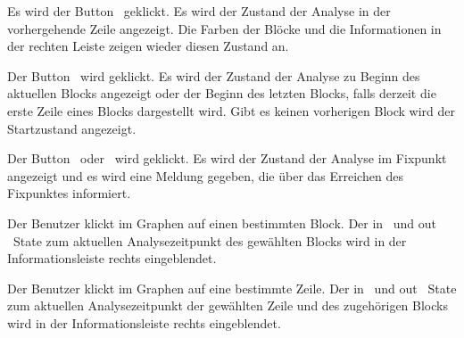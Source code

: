 {Es wird der Button \faBackward\ geklickt.}
{Es wird der Zustand der Analyse in der vorhergehende Zeile angezeigt. Die Farben der Blöcke und die Informationen in der rechten Leiste zeigen wieder diesen Zustand an.}

{Der Button \faFastBackward\ wird geklickt.}
{Es wird der Zustand der Analyse zu Beginn des aktuellen Blocks angezeigt oder der Beginn des letzten Blocks, falls derzeit die erste Zeile eines Blocks dargestellt wird. Gibt es keinen vorherigen Block wird der Startzustand angezeigt.}

{Der Button \faForward\ oder \faFastForward\ wird geklickt.}
{Es wird der Zustand der Analyse im Fixpunkt angezeigt und es wird eine Meldung gegeben, die über das Erreichen des Fixpunktes informiert.}

\tests{}

{Der Benutzer klickt im Graphen auf einen bestimmten Block.}
{Der \glqq in \grqq\ und \glqq out \grqq\ State zum aktuellen Analysezeitpunkt des gewählten Blocks wird in der Informationsleiste rechts eingeblendet.}

{Der Benutzer klickt im Graphen auf eine bestimmte Zeile.}
{Der \glqq in \grqq\ und \glqq out \grqq\ State zum aktuellen Analysezeitpunkt der gewählten Zeile und des zugehörigen Blocks wird in der Informationsleiste rechts eingeblendet.}
